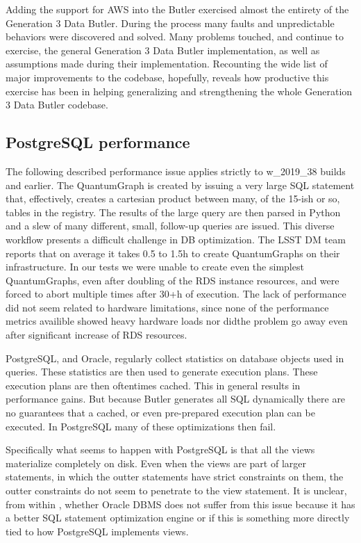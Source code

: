 Adding the support for AWS into the Butler exercised almost the entirety of the Generation 3 Data Butler. During the process many faults and unpredictable behaviors were discovered and solved. Many problems touched, and continue to exercise, the general Generation 3 Data Butler implementation, as well as assumptions made during their implementation. Recounting the wide list of major improvements to the codebase, hopefully, reveals how productive this exercise has been in helping generalizing and strengthening the whole Generation 3 Data Butler codebase.

\subsection{PostgreSQL performance}

The following described performance issue applies strictly to w\_2019\_38 builds and earlier. The QuantumGraph is created by issuing a very large SQL statement that, effectively, creates a cartesian product between many, of the 15-ish or so, tables in the registry. The results of the large query are then parsed in Python and a slew of many different, small, follow-up queries are issued. This diverse workflow presents a difficult challenge in DB optimization. The LSST DM team reports that on average it takes 0.5 to 1.5h to create QuantumGraphs on their infrastructure. In our tests we were unable to create even the simplest QuantumGraphs, even after doubling of the RDS instance resources, and were forced to abort multiple times after 30+h of execution. The lack of performance did not seem related to hardware limitations, since none of the performance metrics availible showed heavy hardware loads nor didthe problem go away even after significant increase of RDS resources. 

PostgreSQL, and Oracle, regularly collect statistics on database objects used in queries. These statistics are then used to generate execution plans. These execution plans are then oftentimes cached. This in general results in performance gains. But because Butler generates all SQL dynamically there are no guarantees that a cached, or even pre-prepared execution plan can be executed. In PostgreSQL many of these optimizations then fail.

Specifically what seems to happen with PostgreSQL is that all the views materialize completely on disk. Even when the views are part of larger statements, in which the outter statements have strict constraints on them, the outter constraints do not seem to penetrate to the view statement. It is unclear, from within \poc, whether Oracle DBMS does not suffer from this issue because it has a better SQL statement optimization engine or if this is something more directly tied to how PostgreSQL implements views. 

